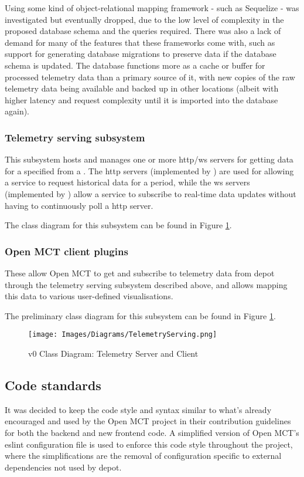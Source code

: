 Using some kind of object-relational mapping framework - such as Sequelize - was investigated but eventually dropped, due to the low level of complexity in the proposed database schema and the queries required. There was also a lack of demand for many of the features that these frameworks come with, such as support for generating database migrations to preserve data if the database schema is updated. The database functions more as a cache or buffer for processed telemetry data than a primary source of it, with new copies of the raw telemetry data being available and backed up in other locations (albeit with higher latency and request complexity until it is imported into the database again).

\subsubsection{Telemetry serving subsystem}
This subsystem hosts and manages one or more \acrshort{http}/\Gls{ws} servers for getting data for a specified  from a . The \acrshort{http} servers (implemented by ) are used for allowing a service to request historical data for a period, while the \Gls{ws} servers (implemented by ) allow a service to subscribe to real-time data updates without having to continuously poll a \acrshort{http} server.

The class diagram for this subsystem can be found in Figure \ref{fig:cdserving}.

\subsubsection{Open MCT client plugins}
These allow Open MCT to get and subscribe to telemetry data from \Gls{depot} through the telemetry serving subsystem described above, and allows mapping this data to various user-defined visualisations.

The preliminary class diagram for this subsystem can be found in Figure \ref{fig:cdserving}.

\begin{figure}[H]
  \centering
  \texttt{[image: Images/Diagrams/TelemetryServing.png]}
  \caption{v0 Class Diagram: Telemetry Server and Client}
  \label{fig:cdserving}
\end{figure}

\subsection{Code standards}
It was decided to keep the code style and syntax similar to what’s already encouraged and used by the Open MCT project in their contribution guidelines \cite{omct_contributing} for both the \gls{backend} and new \gls{frontend} code. A simplified version of Open MCT’s \Gls{eslint} configuration file is used to enforce this code style throughout the project, where the simplifications are the removal of configuration specific to external dependencies not used by \Gls{depot}.